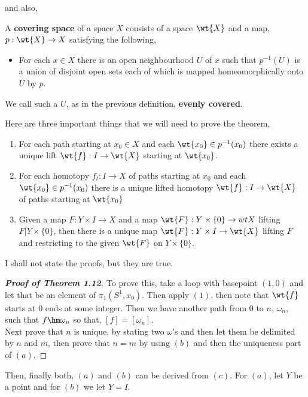 and also,
\begin{ndefi}
  A \textbf{covering space} of a space $X$ consists of a space $\wt{X}$ and a map, $p : \wt{X} \to X$ satisfying the following,
  \begin{itemize}
    \item For each $x \in X$ there is an open neighbourhood $U$ of $x$ such that $p^{-1}(U)$ is a union of disjoint open sets each of which is mapped homeomorphically onto $U$ by $p$.
  \end{itemize}
\end{ndefi}

\begin{ndefi}
  We call such a $U$, as in the previous definition, \textbf{evenly covered}.
\end{ndefi}

Here are three important things that we will need to prove the theorem,
\begin{enumerate}
  \item For each path starting at $x_0\in X$ and each $\wt{x_0} \in p^{-1}(x_0)$ there exists a unique lift $\wt{f} : I \to \wt{X}$ starting at $\wt{x_0}$.
  \item For each homotopy $f_t : I \to X$ of paths starting at $x_0$ and each $\wt{x_0} \in p^{-1}(x_0)$ there is a unique lifted homotopy $\wt{f} : I \to \wt{X}$ of paths starting at $\wt{x_0}$
  \item Given a map $F : Y \times I \to X$ and a map $\wt{F}: Y \times \{0\} \to wt{X}$ lifting $F | Y \times \{0\}$, then there is a unique map $\wt{F} : Y \times I \to \wt{X}$ lifting $F$ and restricting to the given $\wt{F}$ on $Y \times \{0\}$.
\end{enumerate}
I shall not state the proofs, but they are true.

\begin{proof}[\textbf{Proof of Theorem 1.12}]
  To prove this, take a loop with basepoint $(1, 0)$ and let that be an element of $\pi_1(S^1, x_0)$. Then apply $(1)$, then note that $\wt{f}$ starts at $0$ ends at some integer. Then we have another path from $0$ to $n$, $\omega_n$, such that ${f} \hm \omega_n$ so that, $[f] = [\omega_n]$.\\
  Next prove that $n$ is unique, by stating two $\omega$'s and then let them be delimited by $n$ and $m$, then prove that $n = m$ by using $(b)$ and then the uniqueness part of $(a)$.
\end{proof}
Then, finally both, $(a)$ and $(b)$ can be derived from $(c)$. For $(a)$, let $Y$ be a point and for $(b)$ we let $Y = I$.\\

